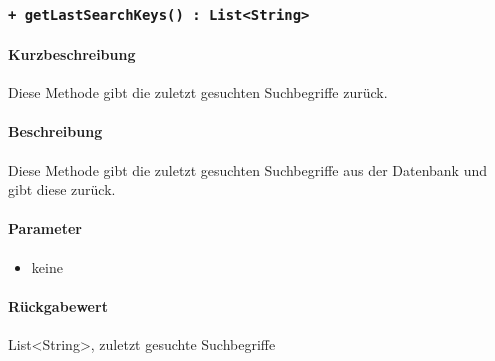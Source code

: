 \subsubsection{\texttt{+ getLastSearchKeys() : List<String>}}%
\paragraph*{Kurzbeschreibung}
Diese Methode gibt die zuletzt gesuchten Suchbegriffe zurück.
\paragraph*{Beschreibung}
Diese Methode gibt die zuletzt gesuchten Suchbegriffe aus der Datenbank und gibt diese zurück.
\paragraph*{Parameter}
\begin{itemize}
    \item keine
\end{itemize}
\paragraph*{Rückgabewert}
List<String>, zuletzt gesuchte Suchbegriffe